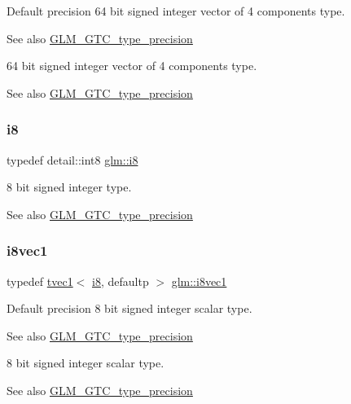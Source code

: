Default precision 64 bit signed integer vector of 4 components type. \begin{DoxySeeAlso}{See also}
\hyperlink{group__gtc__type__precision}{G\+L\+M\+\_\+\+G\+T\+C\+\_\+type\+\_\+precision}
\end{DoxySeeAlso}
64 bit signed integer vector of 4 components type. \begin{DoxySeeAlso}{See also}
\hyperlink{group__gtc__type__precision}{G\+L\+M\+\_\+\+G\+T\+C\+\_\+type\+\_\+precision} 
\end{DoxySeeAlso}
\mbox{\label{group__gtc__type__precision_gaae064be68b7d36cd7910c16e8ad18bba}} 
\subsubsection{\texorpdfstring{i8}{i8}}
{\footnotesize\ttfamily typedef detail\+::int8 \hyperlink{group__gtc__type__precision_gaae064be68b7d36cd7910c16e8ad18bba}{glm\+::i8}}

8 bit signed integer type. \begin{DoxySeeAlso}{See also}
\hyperlink{group__gtc__type__precision}{G\+L\+M\+\_\+\+G\+T\+C\+\_\+type\+\_\+precision} 
\end{DoxySeeAlso}
\mbox{\label{group__gtc__type__precision_ga1cb1ef0f2a9266aba88f161c9062cebc}} 
\subsubsection{\texorpdfstring{i8vec1}{i8vec1}}
{\footnotesize\ttfamily typedef \hyperlink{structglm_1_1tvec1}{tvec1}$<$ \hyperlink{group__gtc__type__precision_gaae064be68b7d36cd7910c16e8ad18bba}{i8}, defaultp $>$ \hyperlink{group__gtc__type__precision_ga1cb1ef0f2a9266aba88f161c9062cebc}{glm\+::i8vec1}}

Default precision 8 bit signed integer scalar type. \begin{DoxySeeAlso}{See also}
\hyperlink{group__gtc__type__precision}{G\+L\+M\+\_\+\+G\+T\+C\+\_\+type\+\_\+precision}
\end{DoxySeeAlso}
8 bit signed integer scalar type. \begin{DoxySeeAlso}{See also}
\hyperlink{group__gtc__type__precision}{G\+L\+M\+\_\+\+G\+T\+C\+\_\+type\+\_\+precision} 
\end{DoxySeeAlso}
\mbox{\label{group__gtc__type__precision_ga277312370b6155b37dbf2a6954c42915}} 
